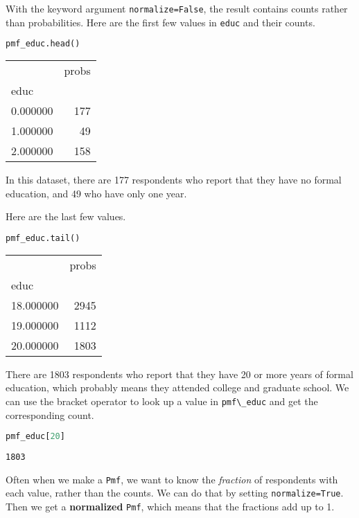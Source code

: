 With the keyword argument \passthrough{\lstinline!normalize=False!}, the
result contains counts rather than probabilities. Here are the first few
values in \passthrough{\lstinline!educ!} and their counts.

\begin{lstlisting}[language=Python,style=source]
pmf_educ.head()
\end{lstlisting}

\begin{tabular}{lr}
\toprule
 & probs \\
educ &  \\
\midrule
0.000000 & 177 \\
1.000000 & 49 \\
2.000000 & 158 \\
\bottomrule
\end{tabular}

In this dataset, there are 177 respondents who report that they have no
formal education, and 49 who have only one year.

\pagebreak

Here are the last few values.

\begin{lstlisting}[language=Python,style=source]
pmf_educ.tail()
\end{lstlisting}

\begin{tabular}{lr}
\toprule
 & probs \\
educ &  \\
\midrule
18.000000 & 2945 \\
19.000000 & 1112 \\
20.000000 & 1803 \\
\bottomrule
\end{tabular}

There are 1803 respondents who report that they have 20 or more years of
formal education, which probably means they attended college and
graduate school. We can use the bracket operator to look up a value in
\passthrough{\lstinline!pmf\_educ!} and get the corresponding count.

\begin{lstlisting}[language=Python,style=source]
pmf_educ[20]
\end{lstlisting}

\begin{lstlisting}[style=output]
1803
\end{lstlisting}

Often when we make a \passthrough{\lstinline!Pmf!}, we want to know the
\emph{fraction} of respondents with each value, rather than the counts.
We can do that by setting \passthrough{\lstinline!normalize=True!}. Then
we get a \textbf{normalized} \passthrough{\lstinline!Pmf!}, which means
that the fractions add up to 1.

